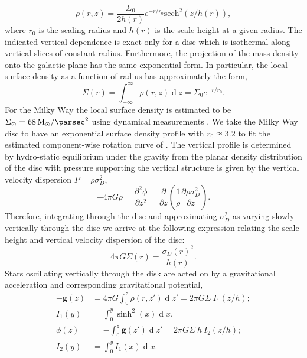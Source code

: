 \documentclass[usenatbib]{mnras}
\renewcommand{\d}[1]{\! \mathrm{d}#1 \:}
\newcommand{\pderiv}[2]{\frac{\partial{#1}}{\partial{#2}}}
\renewcommand{\d}[1]{\ensuremath{\operatorname{d}\!{#1}}}
\begin{document}
\begin{equation}
\rho(r, z) = \frac{\Sigma_0}{2 h(r)} e^{-r/r_0} \mathrm{sech}^2{(z/h(r))}, 
\end{equation}
where $r_0$ is the scaling radius and $h(r)$ is the scale height at a given radius. The indicated vertical dependence is exact only for a disc which is isothermal along vertical slices of constant radius. Furthermore, the projection of the mass density onto the galactic plane has the same exponential form. In particular, the local surface density as a function of radius has approximately the form,
\begin{equation}
\Sigma(r) = \int_{-\infty}^{\infty} \rho(r, z) \d{z} = \Sigma_0 e^{-r / r_0}.
\end{equation}
For the Milky Way the local surface density is estimated to be $\Sigma_{\odot} = \SI{68}{M_{\odot} \per \parsec \squared}$ using dynamical measurements \citep{dynamical_measurement}. We take the Milky Way disc to have an exponential surface density profile with $r_0 \approxeq 3.2$ to fit the estimated component-wise rotation curve of \cite{milky_way_halo}. The vertical profile is determined by hydro-static equilibrium under the gravity from the planar density distribution of the disc with pressure supporting the vertical structure is given by the vertical velocity dispersion $P = \rho \sigma_D^2$,
\begin{equation}
- 4 \pi G \rho = \frac{\partial^2 \phi}{\partial z^2} = \pderiv{}{z} \left( \frac{1}{\rho} \pderiv{ \rho \sigma_D^2}{z} \right).
\end{equation}  
Therefore, integrating through the disc and approximating $\sigma_D^2$ as varying slowly vertically through the disc we arrive at the following expression relating the scale height and vertical velocity dispersion of the disc:
\begin{equation} \label{scale}
4 \pi G \Sigma(r) = \frac{ \sigma_D(r)^2 }{h(r)}.
\end{equation}
Stars oscillating vertically through the disk are acted on by a gravitational acceleration and corresponding gravitational potential,
\begin{subequations}
\begin{align}
-\mathbf{g}(z) & = 4 \pi G \int_0^z \rho(r, z') \d{z'} = 2 \pi G \Sigma \: I_1(z / h) ;
\\
I_1(y) & = \int_0^y \sinh^2(x) \d{x} .
\\
\phi(z) & = - \int_0^z \mathbf{g}(z') \d{z'} = 2 \pi G \Sigma \: h \: I_2(z / h) ; 
\\
I_2(y) & = \int_0^y I_1(x) \d{x}.
\end{align}
\end{subequations}
\end{document}
